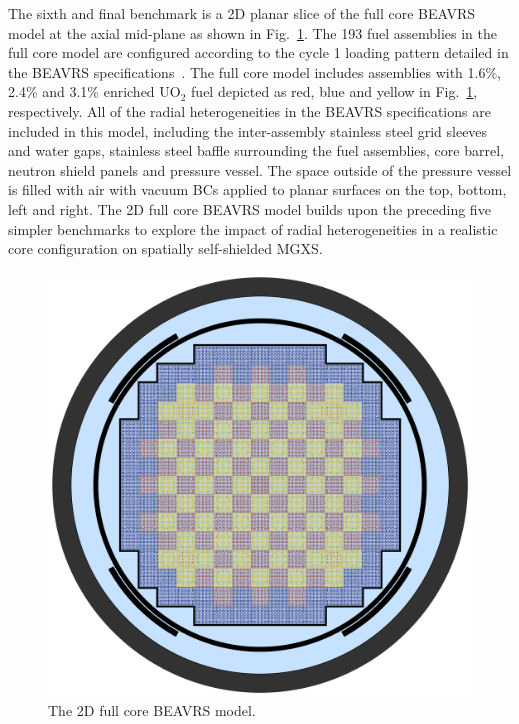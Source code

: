 The sixth and final benchmark is a 2D planar slice of the full core \ac{BEAVRS} model at the axial mid-plane as shown in Fig.~\ref{fig:chap7-full-core}. The 193 fuel assemblies in the full core model are configured according to the cycle 1 loading pattern detailed in the \ac{BEAVRS} specifications~\cite{horelik2013beavrs}. The full core model includes assemblies with 1.6\%, 2.4\% and 3.1\% enriched UO$_2$ fuel depicted as red, blue and yellow in Fig.~\ref{fig:chap7-full-core}, respectively. All of the radial heterogeneities in the \ac{BEAVRS} specifications are included in this model, including the inter-assembly stainless steel grid sleeves and water gaps, stainless steel baffle surrounding the fuel assemblies, core barrel, neutron shield panels and pressure vessel. The space outside of the pressure vessel is filled with air with vacuum \acp{BC} applied to planar surfaces on the top, bottom, left and right. The 2D full core \ac{BEAVRS} model builds upon the preceding five simpler benchmarks to explore the impact of radial heterogeneities in a realistic core configuration on spatially self-shielded \ac{MGXS}.

\begin{figure}[h!]
  \centering
  \includegraphics[width=0.9\linewidth]{figures/benchmarks/full-core}
\vspace{2mm}
\caption[The 2D full core \ac{BEAVRS} model]{The 2D full core \ac{BEAVRS} model.}
\label{fig:chap7-full-core}
\end{figure}


